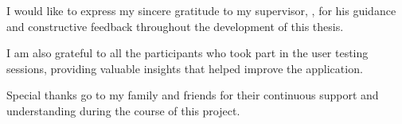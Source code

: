 \begin{thanks}
I would like to express my sincere gratitude to my supervisor, , for his guidance and constructive feedback throughout the development of this thesis.

I am also grateful to all the participants who took part in the user testing sessions, providing valuable insights that helped improve the application.

Special thanks go to my family and friends for their continuous support and understanding during the course of this project.
\end{thanks}